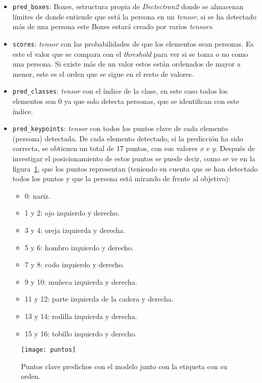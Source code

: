\begin{itemize}
	\item \texttt{pred\_boxes}: Boxes, estructura propia de \textit{Dectectron2} donde se almacenan límites de donde entiende que está la persona en un \textit{tensor}, si se ha detectado más de una persona este Boxes estará creado por varios \textit{tensors}.
	\item \texttt{scores}: \textit{tensor} con las probabilidades de que los elementos sean personas. Es este el valor que se compara con el \textit{threshold} para ver si se toma o no como una persona. Si existe más de un valor estos están ordenados de mayor a menor, este es el orden que se sigue en el resto de valores.
	\item \texttt{pred\_classes}: \textit{tensor} con el índice de la clase, en este caso todos los elementos son 0 ya que solo detecta personas, que se identifican con este índice.
	\item \texttt{pred\_keypoints}: \textit{tensor} con todos los puntos clave de cada elemento (persona) detectada. De cada elemento detectado, si la predicción ha sido correcta, se obtienen un total de 17 puntos, con sus valores $x$ e $y$. Después de investigar el posicionamiento de estos puntos se puede decir, como se ve en la figura~\ref{fig:puntos}, que los puntos representan (teniendo en cuenta que se han detectado todos los puntos y que la persona está mirando de frente al objetivo):
	\begin{itemize}
		\item 0: nariz.
		\item 1 y 2: ojo izquierdo y derecho.
		\item 3 y 4: oreja izquierda y derecha.
		\item 5 y 6: hombro izquierdo y derecho.
		\item 7 y 8: codo izquierdo y derecho.
		\item 9 y 10: muñeca izquierda y derecha.
		\item 11 y 12: parte izquierda de la cadera y derecha.
		\item 13 y 14: rodilla izquierda y derecha.
		\item 15 y 16: tobillo izquierdo y derecho.
	\end{itemize}
\end{itemize}

\begin{figure}[h]
	\centering
	\texttt{[image: puntos]}
	\caption{Puntos clave predichos con el modelo junto con la etiqueta con su orden.}
	\label{fig:puntos}
\end{figure}
